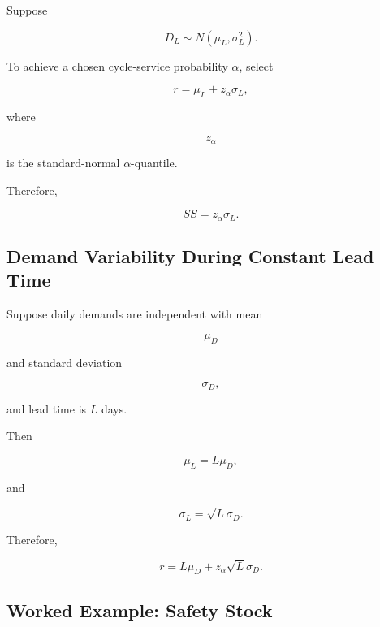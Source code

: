 Suppose

\[
D_L
\sim
N
(
\mu_L,
\sigma_L^2
).
\]

To achieve a chosen cycle-service probability \(\alpha\), select

\[
\boxed{
r
=
\mu_L
+
z_\alpha\sigma_L,
}
\]

where

\[
z_\alpha
\]

is the standard-normal \(\alpha\)-quantile.

Therefore,

\[
\boxed{
SS
=
z_\alpha\sigma_L.
}
\]

\subsection{Demand Variability During Constant Lead Time}
\label{subsec:demand-variability-lead-time}

Suppose daily demands are independent with mean

\[
\mu_D
\]

and standard deviation

\[
\sigma_D,
\]

and lead time is \(L\) days.

Then

\[
\boxed{
\mu_L
=
L\mu_D,
}
\]

and

\[
\boxed{
\sigma_L
=
\sqrt{L}\sigma_D.
}
\]

Therefore,

\[
\boxed{
r
=
L\mu_D
+
z_\alpha
\sqrt{L}\sigma_D.
}
\]

\subsection{Worked Example: Safety Stock}
\label{subsec:worked-safety-stock}

